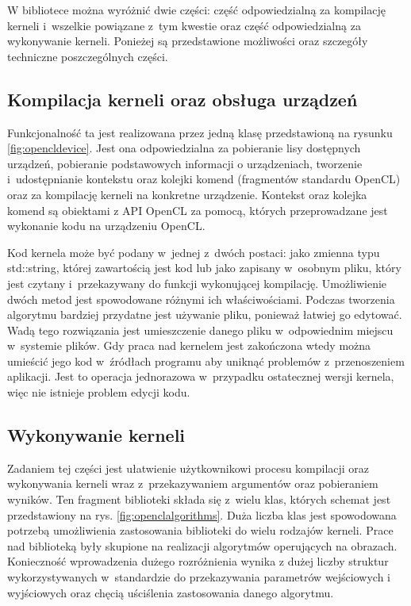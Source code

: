 W bibliotece można wyróżnić dwie części: część odpowiedzialną za kompilację kerneli i~wszelkie powiązane z~tym kwestie oraz część odpowiedzialną za wykonywanie kerneli.
Ponieżej są przedstawione możliwości oraz szczegóły techniczne poszczególnych części.

\subsection{Kompilacja kerneli oraz obsługa urządzeń}
\label{subsec:kompilacjakerneli}
Funkcjonalność ta jest realizowana przez jedną klasę przedstawioną na rysunku \ref{fig:opencldevice}. Jest ona odpowiedzialna za pobieranie lisy dostępnych urządzeń, pobieranie podstawowych informacji o urządzeniach, tworzenie i~udostępnianie kontekstu oraz kolejki komend (fragmentów standardu OpenCL) oraz za kompilację kerneli na konkretne urządzenie. Kontekst oraz kolejka komend są obiektami z API OpenCL za pomocą, których przeprowadzane jest wykonanie kodu na urządzeniu OpenCL.

Kod kernela może być podany w~jednej z~dwóch postaci: jako zmienna typu std::string, której zawartością jest kod lub jako zapisany w~osobnym pliku, który jest czytany i~przekazywany do funkcji wykonującej kompilację. Umożliwienie dwóch metod jest spowodowane różnymi ich właściwościami. Podczas tworzenia algorytmu bardziej przydatne jest używanie pliku, ponieważ łatwiej go edytować.  Wadą tego rozwiązania jest umieszczenie danego pliku w~odpowiednim miejscu w~systemie plików. Gdy praca nad kernelem jest zakończona wtedy można umieścić jego kod w~źródłach programu aby uniknąć problemów z~przenoszeniem aplikacji. Jest to operacja jednorazowa w~przypadku ostatecznej wersji kernela, więc nie istnieje problem edycji kodu.

\subsection{Wykonywanie kerneli}
\label{subsec:wykonywaniekerneli}
Zadaniem tej części jest ułatwienie użytkownikowi procesu kompilacji oraz wykonywania kerneli wraz z~przekazywaniem argumentów oraz pobieraniem wyników. Ten fragment biblioteki składa się z~wielu klas, których schemat jest przedstawiony na rys. \ref{fig:openclalgorithms}. Duża liczba klas jest spowodowana potrzebą umożliwienia zastosowania biblioteki do wielu rodzajów kerneli. Prace nad biblioteką były skupione na realizacji algorytmów operujących na obrazach. Konieczność wprowadzenia dużego rozróżnienia wynika z dużej liczby struktur wykorzystywanych w~standardzie do przekazywania parametrów wejściowych i wyjściowych oraz chęcią uściślenia zastosowania danego algorytmu.


